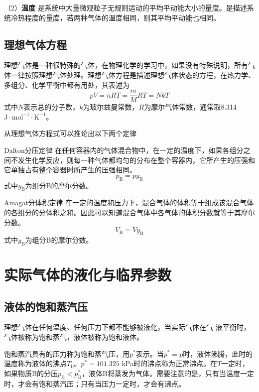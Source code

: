 \documentclass[lang=cn,newtx,10pt,scheme=chinese]{elegantbook}
\begin{document}
（2）\textbf{温度} \quad 是系统中大量微观粒子无规则运动的平均平动能大小的量度。是描述系统冷热程度的量度，若两种气体的温度相同，则其平均平动能也相同。

\subsection{理想气体方程}
理想气体是一种很特殊的气体，在物理化学的学习中，如果没有特殊说明，所有气体一律按照理想气体处理。理想气体方程是描述理想气体状态的方程，在热力学、多组分、化学平衡中都有用处，其表述为
\begin{equation}
	pV=nRT=\frac{m}{M}RT=NkT
\end{equation}
式中$N$表示总的分子数，$k$为玻尔兹曼常数，$R$为摩尔气体常数，通常取8.314 $\mathrm{J \cdot mol^{-1} \cdot K^{-1}}$。

从理想气体方程式可以推论出以下两个定律
\begin{theorem}{Dalton分压定律}
	在任何容器内的气体混合物中，在一定的温度下，如果各组分之间不发生化学反应，则每一种气体都均匀的分布在整个容器内，它所产生的压强和它单独占有整个容器时所产生的压强相同。
	\begin{equation}
		p_{\mathrm{B}}=py_{\mathrm{B}}
	\end{equation}
	式中$y_{\mathrm{B}}$为组分B的摩尔分数。
\end{theorem}

\begin{theorem}{Amagat分体积定律}
	在一定的温度和压力下，混合气体的体积等于组成该混合气体的各组分的分体积之和。因此可以知道混合气体中各气体的体积分数就等于其摩尔分数。
	\begin{equation}
		V_{\mathrm{B}}=Vy_{\mathrm{B}}
	\end{equation}
	式中$y_{\mathrm{B}}$为组分B的摩尔分数。
\end{theorem}

\section{实际气体的液化与临界参数}

\subsection{液体的饱和蒸汽压}
理想气体在任何温度、任何压力下都不能够被液化，当实际气体在气-液平衡时，气体被称为饱和蒸气，液体被称为饱和液体。

饱和蒸汽具有的压力称为饱和蒸气压，用$p^*$表示。当$p^*=p$时，液体沸腾，此时的温度称为液体的沸点$T_\mathrm{b}$。$p^* = 101.325$ kPa时的沸点称为正常沸点。在$T$一定时，如果物质B的分压$p_\mathrm{B}<p_\mathrm{B}^*$，液体B将蒸发为气体。需要注意的是，只有当温度一定时，才会有饱和蒸汽压；只有当压力一定时，才会有沸点。
\end{document}
